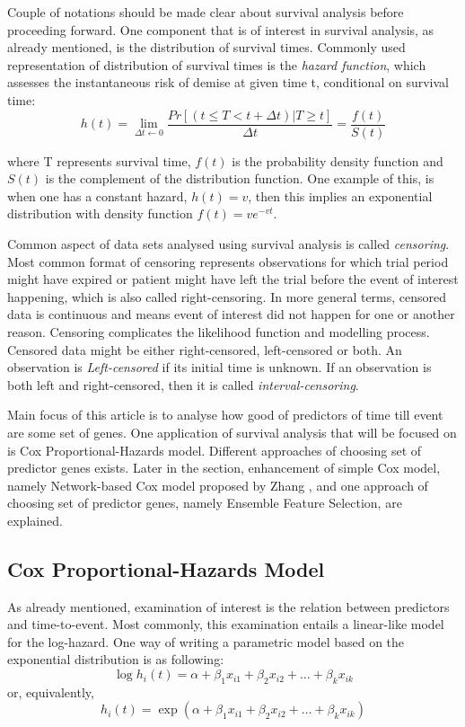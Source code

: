 \documentclass{ba-kecs}
\numberwithin{figure}{section}
\numberwithin{equation}{section}
\begin{document}
Couple of notations should be made clear about survival analysis before proceeding forward. One component that is of interest in survival analysis, as already mentioned, is the distribution of survival times. Commonly used representation of distribution of survival times is the \textit{hazard function}, which assesses the instantaneous risk of demise at given time t, conditional on survival time:
\begin{equation}
h(t) = \lim_{\Delta{t} \leftarrow 0} \dfrac{Pr[(t \leq T < t + \Delta{t})|T \geq t]}{\Delta{t}} = \dfrac{f(t)}{S(t)}
\end{equation}

where T represents survival time, $f(t)$ is the probability density function and $S(t)$ is the complement of the distribution function. One example of this, is when one has a constant hazard, $h(t) = v$, then this implies an exponential distribution with density function $f(t) = ve^{-vt}$.

Common aspect of data sets analysed using survival analysis is called \textit{censoring}. Most common format of censoring represents observations for which trial period might have expired or patient might have left the trial before the event of interest happening, which is also called right-censoring. In more general terms, censored data is continuous and means event of interest did not happen for one or another reason. Censoring complicates the likelihood function and modelling process. Censored data might be either right-censored, left-censored or both. An observation is \textit{Left-censored} if its initial time is unknown. If an observation is both left and right-censored, then it is called \textit{interval-censoring}.

Main focus of this article is to analyse how good of predictors of time till event are some set of genes. One application of survival analysis that will be focused on is Cox Proportional-Hazards model. Different approaches of choosing set of predictor genes exists. Later in the section, enhancement of simple Cox model, namely Network-based Cox model proposed by Zhang \cite{netcox}, and one approach of choosing set of predictor genes, namely Ensemble Feature Selection, are explained.

\subsection{Cox Proportional-Hazards Model}
As already mentioned, examination of interest is the relation between predictors and time-to-event. Most commonly, this examination entails a linear-like model for the log-hazard. One way of writing a parametric model based on the exponential distribution is as following:
\begin{equation}
\log{h_{i}(t)} = \alpha + \beta_{1}x_{i1} + \beta_{2}x_{i2} + \hdots + \beta_{k}x_{ik}
\end{equation}
or, equivalently,
\begin{equation}
h_i(t) = \exp(\alpha + \beta_{1}x_{i1} + \beta_{2}x_{i2} + \hdots + \beta_{k}x_{ik})
\end{equation}
\end{document}
